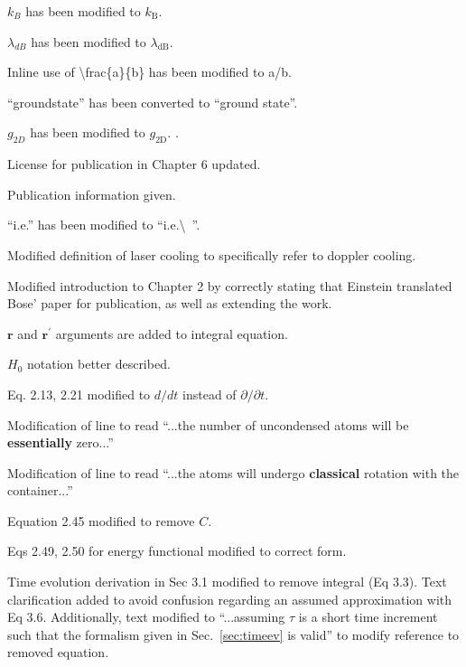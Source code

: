 \documentclass[paper=a4, fontsize=12pt]{scrartcl}
\begin{document}
\begin{description}[align=left]
    \item [Throughout] $k_B$ has been modified to $k_\textrm{B}$.
    \item [Throughout] $\lambda_{dB}$ has been modified to $\lambda_\textrm{dB}$.
    \item [Throughout] Inline use of
\textbackslash frac\{a\}\{b\} has been modified to a/b.
    \item [Throughout] ``groundstate'' has been converted to ``ground state''.
    \item [Throughout] $g_{2D}$ has been modified to $g_\textrm{2D}$.
.
    \item [P vi] License for publication in Chapter 6 updated.
    \item [P5] Publication information given.
    \item [Throughout] ``i.e.'' has been modified to ``i.e.\textbackslash \ ''.
    \item [P6] Modified definition of laser cooling to specifically refer to doppler cooling.
    \item [P7] Modified introduction to Chapter 2 by correctly stating that Einstein translated Bose' paper for publication, as well as extending the work.
    \item [P10] $\mathbf{r}$ and $\mathbf{r}^{\prime}$ arguments are added to integral equation.
    \item [P10] $H_0$ notation better described.
    \item [P11,12] Eq. 2.13, 2.21 modified to $d/dt$ instead of $\partial / \partial t$.
    \item [P12] Modification of line to read ``...the number of uncondensed atoms will be \textbf{essentially} zero...''
    \item [P18] Modification of line to read ``...the atoms will undergo \textbf{classical} rotation with the container...''
    \item [P20] Equation 2.45 modified to remove $C$.
    \item [P21] Eqs 2.49, 2.50 for energy functional modified to correct form.
    \item [P29] Time evolution derivation in Sec 3.1 modified to remove integral (Eq 3.3). Text clarification added to avoid confusion regarding an assumed approximation with Eq 3.6. Additionally, text modified to ``...assuming $\tau$ is a short time increment such that the formalism given in Sec.~\ref{sec:timeev} is valid'' to modify reference to removed equation.

\end{description}
\end{document}
